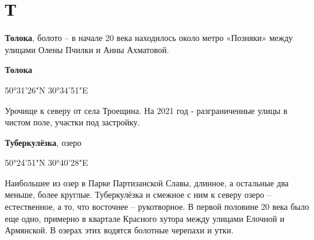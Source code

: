 \chapter*{Т}


\textbf{Толока}, болото – в начале 20 века находилось около метро «Позняки» между улицами Олены Пчилки и Анны Ахматовой.\\

\medskip

\textbf{Толока}

50°31'26"N 30°34'51"E

Урочище к северу от села Троещина. На 2021 год - разграниченные улицы в чистом поле, участки под застройку.\\

\medskip


\textbf{Туберкулёзка}, озеро 

50°24'51"N 30°40'28"E

Наибольшее из озер в Парке Партизанской Славы, длинное, а остальные два меньше, более круглые. Туберкулёзка и смежное с ним к северу озеро – естественное, а то, что восточнее – рукотворное. В первой половине 20 века было еще одно, примерно в квартале Красного хутора между улицами Елочной и Армянской. В озерах этих водятся болотные черепахи и утки.
